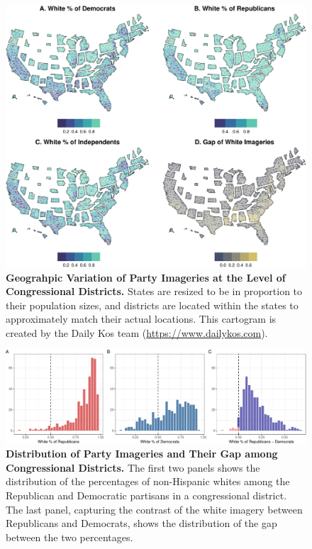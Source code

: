 \documentclass[
  12pt,
]{article}
\begin{document}
\begin{figure}[tb]

{\centering \includegraphics{local-images_files/figure-pdf/fig-map-1.pdf}

}

\caption{\label{fig-map}\textbf{Geograhpic Variation of Party Imageries
at the Level of Congressional Districts.} States are resized to be in
proportion to their population sizes, and districts are located within
the states to approximately match their actual locations. This cartogram
is created by the Daily Kos team (\url{https://www.dailykos.com}).}

\end{figure}

\begin{figure}[tb]

{\centering \includegraphics{local-images_files/figure-pdf/fig-hist-1.pdf}

}

\caption{\label{fig-hist}\textbf{Distribution of Party Imageries and
Their Gap among Congressional Districts.} The first two panels shows the
distribution of the percentages of non-Hispanic whites among the
Republican and Democratic partisans in a congressional district. The
last panel, capturing the contrast of the white imagery between
Republicans and Democrats, shows the distribution of the gap between the
two percentages.}

\end{figure}
\end{document}
